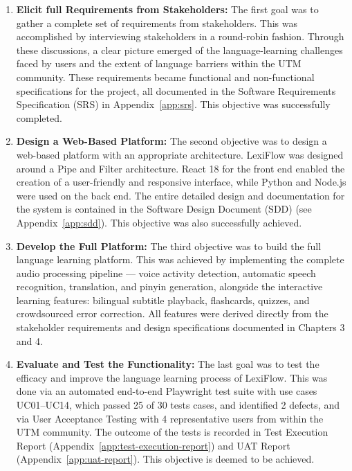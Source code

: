 \documentclass[oneside]{utmthesis}
\begin{document}
\begin{enumerate}[label= (\alph*)]
    \item \textbf{Elicit full Requirements from Stakeholders:} The first goal was to gather a complete set of requirements from stakeholders. This was accomplished by interviewing stakeholders in a round-robin fashion. Through these discussions, a clear picture emerged of the language-learning challenges faced by users and the extent of language barriers within the UTM community. These requirements became functional and non-functional specifications for the project, all documented in the Software Requirements Specification (SRS) in Appendix~\ref{app:srs}. This objective was successfully completed.
    \item \textbf{Design a Web-Based Platform:} The second objective was to design a web-based platform with an appropriate architecture. LexiFlow was designed around a Pipe and Filter architecture. React 18 for the front end enabled the creation of a user-friendly and responsive interface, while Python and Node.js were used on the back end. The entire detailed design and documentation for the system is contained in the Software Design Document (SDD) (see Appendix~\ref{app:sdd}). This objective was also successfully achieved.
    \item \textbf{Develop the Full Platform:} The third objective was to build the full language learning platform. This was achieved by implementing the complete audio processing pipeline — voice activity detection, automatic speech recognition, translation, and pinyin generation, alongside the interactive learning features: bilingual subtitle playback, flashcards, quizzes, and crowdsourced error correction. All features were derived directly from the stakeholder requirements and design specifications documented in Chapters 3 and 4.
    \item \textbf{Evaluate and Test the Functionality:} The last goal was to test the efficacy and improve the language learning process of LexiFlow. This was done via an automated end-to-end Playwright test suite with use cases UC01–UC14, which passed 25 of 30 tests cases, and identified 2 defects, and via User Acceptance Testing with 4 representative users from within the UTM community. The outcome of the tests is recorded in Test Execution Report (Appendix~\ref{app:test-execution-report}) and UAT Report (Appendix~\ref{app:uat-report}). This objective is deemed to be achieved.
\end{enumerate}
\end{document}
